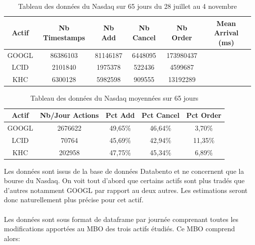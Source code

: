 \documentclass[12pt,a4paper]{article}
\theoremstyle{definition}
\theoremstyle{remark}
\begin{document}
\begin{table}[h!]
\centering
\begin{tabular}{|c|c|c|c|c|c|}
\hline
\textbf{Actif}& \textbf{Nb Timestamps} & \textbf{Nb Add} & \textbf{Nb Cancel} & \textbf{Nb Order} & \textbf{Mean Arrival (ms)}\\ \hline
GOOGL  & 86386103         & 81146187        & 6448095    & 173980437  & \phantom{000} \\ 
\hline
LCID       & 2101840         & 1975378         & 522436  & 4599687  & \phantom{000} \\
\hline
KHC   & 6300128   & 5982598 & 909555 & 13192289  & \phantom{000}                   
\\ \hline
\end{tabular}
\caption{Tableau des données du Nasdaq sur 65 jours du 28 juillet au 4 novembre}
\label{tab:exemple}
\end{table}
\begin{table}[h!]
\centering
\begin{tabular}{|c|c|c|c|c|}
\hline
\textbf{Actif}& \textbf{Nb/Jour Actions}& \textbf{Pct Add} & \textbf{Pct Cancel} & \textbf{Pct Order}\\ \hline
GOOGL & 2676622 & 49,65\%  & 46,64\%     & 3,70\%    \\ 
\hline
LCID  & 70764   & 45,69\%  & 42,94\%    &11,35\%    \\
\hline
KHC  & 202958   & 47,75\%  & 45,34\%  & 6,89\%                     
\\ \hline
\end{tabular}
\caption{Tableau des données du Nasdaq moyennées sur 65 jours}
\label{tab:exemple}
\end{table}
Les données sont issus de la base de données Databento et ne concernent que la bourse du Nasdaq. On voit tout d'abord que certains actifs sont plus tradés que d'autres notamment GOOGL par rapport au deux autres. Les estimations seront donc naturellement plus précise pour cet actif.
\\
\\
Les données sont sous format de dataframe par journée comprenant toutes les modifications apportées au MBO des trois actifs étudiés. Ce MBO comprend alors:
\end{document}
